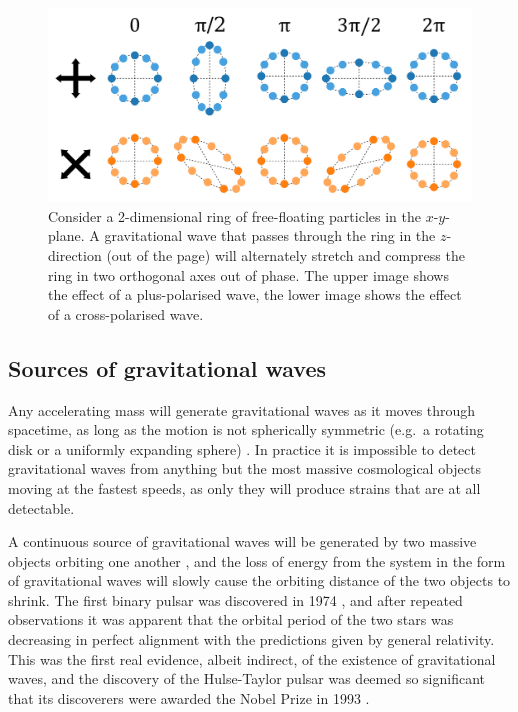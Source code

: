 \begin{colsection}
\begin{colsection}
\begin{figure}[t]
    \begin{center}
        \includegraphics[width=0.8\linewidth]{images/waveimg2.pdf}
    \end{center}
    \caption[Gravitational wave polarisations]{
        Consider a 2-dimensional ring of free-floating particles in the $x$-$y$-plane. A gravitational wave that passes through the ring in the $z$-direction (out of the page) will alternately stretch and compress the ring in two orthogonal axes out of phase. The upper image shows the effect of a plus-polarised wave, the lower image shows the effect of a cross-polarised wave.
        }\label{fig:wave}
\end{figure}

\end{colsection}


\subsection{Sources of gravitational waves}
\label{sec:gw_sources}
\begin{colsection}

Any accelerating mass will generate gravitational waves as it moves through spacetime, as long as the motion is not spherically symmetric (e.g.\ a rotating disk or a uniformly expanding sphere) \citep{BIGcardiff,BIGparis}. In practice it is impossible to detect gravitational waves from anything but the most massive cosmological objects moving at the fastest speeds, as only they will produce strains that are at all detectable.

A continuous source of gravitational waves will be generated by two massive objects orbiting one another \citep{GW_sources}, and the loss of energy from the system in the form of gravitational waves will slowly cause the orbiting distance of the two objects to shrink. The first binary pulsar was discovered in 1974 \citep{HulseTaylor}, and after repeated observations it was apparent that the orbital period of the two stars was decreasing in perfect alignment with the predictions given by general relativity. This was the first real evidence, albeit indirect, of the existence of gravitational waves, and the discovery of the Hulse-Taylor pulsar was deemed so significant that its discoverers were awarded the Nobel Prize in 1993 \citep{HulseTaylor2}.


\end{colsection}
\end{colsection}
